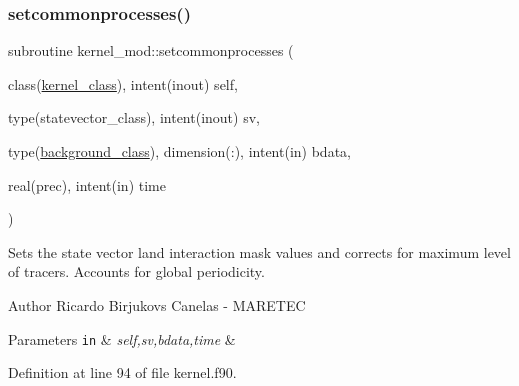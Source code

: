 \subsubsection{\texorpdfstring{setcommonprocesses()}{setcommonprocesses()}}
{\footnotesize\ttfamily subroutine kernel\+\_\+mod\+::setcommonprocesses (\begin{DoxyParamCaption}\item[{class(\mbox{\hyperlink{structkernel__mod_1_1kernel__class}{kernel\+\_\+class}}), intent(inout)}]{self,  }\item[{type(statevector\+\_\+class), intent(inout)}]{sv,  }\item[{type(\mbox{\hyperlink{structbackground__mod_1_1background__class}{background\+\_\+class}}), dimension(\+:), intent(in)}]{bdata,  }\item[{real(prec), intent(in)}]{time }\end{DoxyParamCaption})}



Sets the state vector land interaction mask values and corrects for maximum level of tracers. Accounts for global periodicity. 

\begin{DoxyAuthor}{Author}
Ricardo Birjukovs Canelas -\/ M\+A\+R\+E\+T\+EC 
\end{DoxyAuthor}

\begin{DoxyParams}[1]{Parameters}
\mbox{\tt in}  & {\em self,sv,bdata,time} & \\
\hline
\end{DoxyParams}


Definition at line 94 of file kernel.\+f90.


